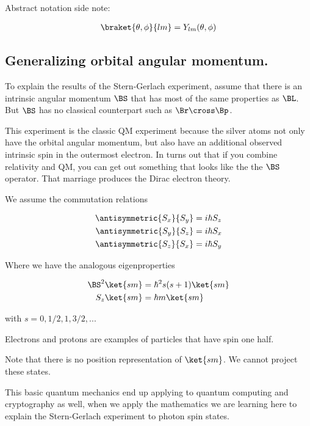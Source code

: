 Abstract notation side note:

\begin{align}\label{eqn:PHY356Foct19:1018}
\braket{\theta,\phi}{lm} = Y_{lm}(\theta, \phi)
\end{align}

\subsection{Generalizing orbital angular momentum.}

To explain the results of the Stern-Gerlach experiment, assume that there is an intrinsic angular momentum $\BS$ that has most of the same properties as $\BL$.  But $\BS$ has no classical counterpart such as $\Br \cross \Bp$.

This experiment is the classic QM experiment because the silver atoms not only have the orbital angular momentum, but also have an additional observed intrinsic spin in the outermost electron.  In turns out that if you combine relativity and QM, you can get out something that looks like the the $\BS$ operator.  That marriage produces the Dirac electron theory.

We assume the commutation relations

\begin{align}\label{eqn:PHY356Foct19:2000}
\antisymmetric{S_x}{S_y} &= i \hbar S_z \\
\antisymmetric{S_y}{S_z} &= i \hbar S_x \\
\antisymmetric{S_z}{S_x} &= i \hbar S_y
\end{align}

Where we have the analogous eigenproperties

\begin{align}\label{eqn:PHY356Foct19:2001}
\BS^2 \ket{sm} &= \hbar^2 s(s+1) \ket{sm} \\
S_z \ket{sm} &= \hbar m \ket{sm}
\end{align}

with $s = 0, 1/2, 1, 3/2, ...$

Electrons and protons are examples of particles that have spin one half.

Note that there is no position representation of $\ket{sm}$.  We cannot project these states.

This basic quantum mechanics end up applying to quantum computing and cryptography as well, when we apply the mathematics we are learning here to explain the Stern-Gerlach experiment to photon spin states.


